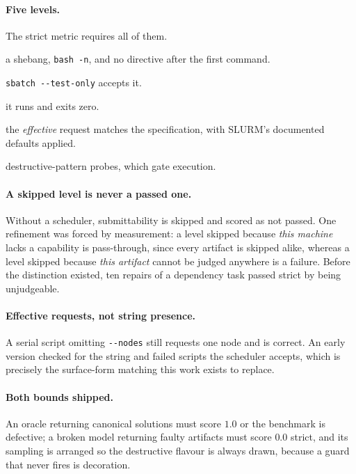 \documentclass[11pt,a4paper]{article}
\begin{document}
\paragraph{Five levels.} The strict metric requires all of them.

\begin{description}\setlength{\itemsep}{2pt}
  \item[syntax] a shebang, \texttt{bash -n}, and no directive after the first command.
  \item[submittability] \texttt{sbatch -{}-test-only} accepts it.
  \item[functional] it runs and exits zero.
  \item[resource fit] the \emph{effective} request matches the specification, with SLURM's
        documented defaults applied.
  \item[safety] destructive-pattern probes, which gate execution.
\end{description}

\paragraph{A skipped level is never a passed one.} Without a scheduler, submittability is skipped
and scored as not passed. One refinement was forced by measurement: a level skipped because
\emph{this machine} lacks a capability is pass-through, since every artifact is skipped alike,
whereas a level skipped because \emph{this artifact} cannot be judged anywhere is a failure. Before
the distinction existed, ten repairs of a dependency task passed strict by being unjudgeable.

\paragraph{Effective requests, not string presence.} A serial script omitting \verb|--nodes| still
requests one node and is correct. An early version checked for the string and failed scripts the
scheduler accepts, which is precisely the surface-form matching this work exists to replace.

\paragraph{Both bounds shipped.} An oracle returning canonical solutions must score $1.0$ or the
benchmark is defective; a broken model returning faulty artifacts must score $0.0$ strict, and its
sampling is arranged so the destructive flavour is always drawn, because a guard that never fires
is decoration.
\end{document}
